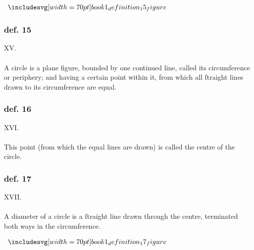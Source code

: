 \begin{minipage}{0.33\textwidth}
    \begin{center}
        $\img[0][0][70]{book1_definition_15_figure}$
    \end{center}
\end{minipage}%
\begin{minipage}{0.67\textwidth}
    \subsubsection{def. 15}
    \begin{center}
        XV.\label{book1def15}\\
        \hfill\\
        A circle is a plane figure, bounded by one continued line, called its circumference or periphery; and having a certain point within it, from which all ſtraight lines drawn to its circumference are equal.
    \end{center}
\end{minipage}

\hfill

\begin{minipage}{0.33\textwidth}
    \phantom{}
\end{minipage}%
\begin{minipage}{0.67\textwidth}
    \subsubsection{def. 16}
    \begin{center}
        XVI.\label{book1def16}\\
        \hfill\\
        This point (from which the equal lines are drawn) is called the \mbox{centre} of the circle.
    \end{center}
\end{minipage}

\hfill

\begin{minipage}{0.67\textwidth}
    \subsubsection{def. 17}
    \begin{center}
        XVII.\label{book1def17}\\
        \hfill\\
        A diameter of a circle is a ſtraight line drawn through the centre, terminated both ways in the circumference.
    \end{center}
\end{minipage}%
\begin{minipage}{0.33\textwidth}
    \begin{center}
        $\img[0][0][70]{book1_definition_17_figure}$
    \end{center}
\end{minipage}

